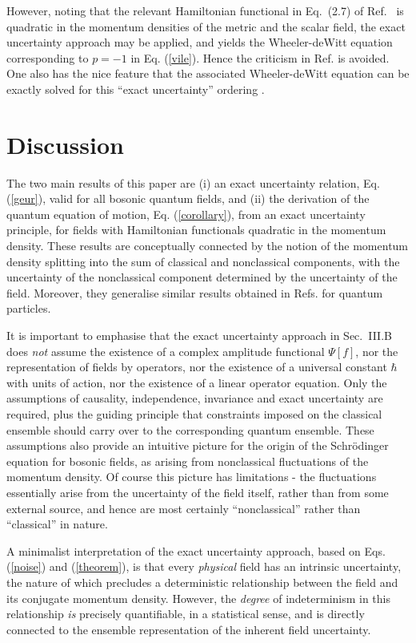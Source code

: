 \documentclass[a4paper,preprint, showpacs, aps, draft]{revtex4}
\begin{document}
{{However, noting that the relevant Hamiltonian functional in Eq.~(2.7) of
Ref.~\cite{vilenkin} is quadratic in the momentum densities of the
metric and the scalar field, the exact uncertainty approach may be
applied, and yields the
Wheeler-deWitt equation corresponding to $p=-1$ in Eq. (\ref{vile}). 
Hence the criticism in Ref. \cite{wiltshire} is avoided.  
One also has the nice feature
that  the associated Wheeler-deWitt equation
can be exactly solved for this ``exact uncertainty'' ordering \cite{vilenkin}.

\section{Discussion}

The two main results of this paper are (i) an exact uncertainty relation,
Eq. (\ref{geur}), valid for all bosonic quantum fields, and (ii) the derivation 
of the
quantum equation of motion, Eq. (\ref{corollary}), from an exact
uncertainty principle, for fields with
Hamiltonian functionals quadratic in the momentum density.
These results are conceptually connected by the
notion of the momentum density splitting into the sum of classical and
nonclassical components, with the uncertainty of the nonclassical
component determined by the uncertainty of the field. Moreover, they 
generalise similar results obtained in Refs. 
\cite{hallfish, eur,hallreg, bamberg} for quantum particles.  

It is important to emphasise that the exact uncertainty approach in
Sec.~III.B 
does {\it not} assume the existence of a complex amplitude functional
$\Psi[f]$, nor the representation of fields by operators, nor the
existence of a universal constant $\hbar$ with units of action, nor the
existence of a linear operator equation.  Only the assumptions of
causality, independence, invariance and exact uncertainty are required,
plus the guiding principle that constraints imposed on the classical
ensemble should carry over to the corresponding quantum ensemble. These
assumptions also provide an intuitive picture for the origin of the
Schr\"{o}dinger equation for bosonic fields, 
as arising from nonclassical fluctuations of
the momentum density.  Of course this picture has limitations - the
fluctuations essentially arise from the uncertainty of the field itself, rather
than from some external source, and hence are 
most certainly ``nonclassical'' rather than ``classical'' 
in nature.  

A minimalist interpretation of the exact uncertainty approach, based on
Eqs. (\ref{noise}) and (\ref{theorem}),
is that every {\it physical} field has an intrinsic uncertainty, 
the nature of which precludes
a deterministic relationship between the field and its
conjugate momentum density.  However, the {\it degree} of indeterminism in
this relationship {\it is} precisely quantifiable, in a statistical sense,
and is directly connected to the ensemble representation of the
inherent field uncertainty.

}}
\end{document}
